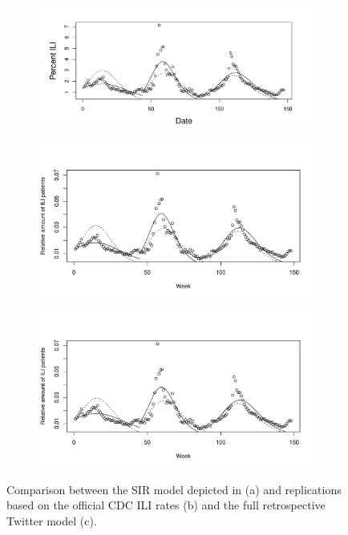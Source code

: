 \documentclass[11pt, a4paper,twoside]{report}\usepackage[]{graphicx}\usepackage[]{color}
\begin{document}
\begin{figure}[H]
\centering
  \begin{subfigure}[t]{0.65\textwidth}
  \includegraphics[width=1\linewidth,height=0.5\linewidth]{todd_bodnar_SIR.png}
  \caption{}
  \label{fig:SIR_comparison_original}
  \end{subfigure}
  
  \begin{subfigure}[t]{0.6\textwidth}
  \includegraphics[width=1\linewidth,height=0.5\linewidth]{SIR_model_cdc_data_25.pdf}
  \caption{}
  \label{fig:SIR_comparison_CDC}
  \end{subfigure}
  
  \begin{subfigure}[t]{0.6\textwidth}
  \includegraphics[width=1\linewidth,height=0.5\linewidth]{SIR_model_full_model_25.pdf}
  \caption{}
  \label{fig:SIR_comparison_full}
  \end{subfigure}
  \caption{Comparison between the SIR model depicted in \citep{bodnar_data_2015} (a) and replications based on the official CDC ILI rates (b) and the full retrospective Twitter model (c).}
\end{figure}
\end{document}
